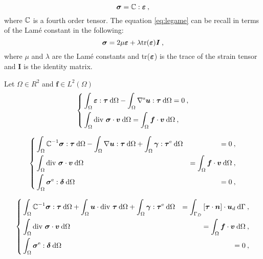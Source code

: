 \begin{equation}	\label{eq:legame}
\bm{\sigma} = \bm{\mathbb{C}} : \bm{\varepsilon}\:,
\end{equation}
where $\bm{\mathbb{C}}$ is a fourth order tensor. The equation \eqref{eq:legame} can be recall in terms of the Lamé constant in the following:
\begin{equation}
\bm{\sigma} = 2\mu\bm{\varepsilon} + \lambda \mbox{tr}(\bm{\varepsilon})\bm{I}\:,
\end{equation}
where $\mu$ and $\lambda$ are the Lamé constants and tr($\bm{\varepsilon}$) is the trace of the strain tensor and $\bm{I}$ is the identity matrix.

Let $\Omega \in R^{2}$ and $\bm{f}\in L^{2}(\Omega)$
\begin{equation} \label{eq:weak_form_0}
\left\lbrace
\begin{split}
&\int_{\Omega} \bm{\varepsilon} : \bm{\tau} \: \text{d}\Omega - \int_{\Omega} \nabla^\text{s}\bm{u} : \bm{\tau} \: \text{d}\Omega = 0\:,\\
&\int_{\Omega} \mbox{div }\bm{\sigma} \cdot \bm{v} \: \text{d}\Omega = \int_{\Omega} \bm{f}\cdot\bm{v}\: \text{d}\Omega\:,
\end{split}
\right.
\end{equation}

\begin{equation} \label{eq:weak_form_1}
\left\lbrace
\begin{split}
&\int_{\Omega} \bm{\mathbb{C}}^{-1}\bm{\sigma} : \bm{\tau} \: \text{d}\Omega - 
\int_{\Omega} \nabla\bm{u} : \bm{\tau} \: \text{d}\Omega + \int_{\Omega} \bm{\gamma} : \bm{\tau}^\text{e} \: \text{d}\Omega &= 0\:,\\
&\int_{\Omega} \mbox{div }\bm{\sigma} \cdot \bm{v} \: \text{d}\Omega &= \int_{\Omega} \bm{f}\cdot\bm{v}\: \text{d}\Omega\:,\\
&\int_{\Omega} \bm{\sigma}^\text{e} : \bm{\delta} \: \text{d}\Omega &= 0 \:,
\end{split}
\right.
\end{equation}


\begin{equation} \label{eq:weak_form_2}
\left\lbrace
\begin{split}
&\int_{\Omega} \bm{\mathbb{C}}^{-1}\bm{\sigma} : \bm{\tau} \: \text{d}\Omega + \int_{\Omega} \bm{u} \cdot \mbox{div }\bm{\tau} \: \text{d}\Omega + \int_{\Omega} \bm{\gamma} : \bm{\tau}^\text{e} \: \text{d}\Omega &= \int_{\Gamma_{D}} \left[\bm{\tau} \cdot \bm{n} \right] \cdot \bm{u}_{d} \: \text{d}\Gamma\:,\\
&\int_{\Omega} \mbox{div }\bm{\sigma} \cdot \bm{v} \: \text{d}\Omega &= \int_{\Omega} \bm{f}\cdot\bm{v}\: \text{d}\Omega\:,\\
&\int_{\Omega} \bm{\sigma}^\text{e} : \bm{\delta} \: \text{d}\Omega &= 0 \:,
\end{split}
\right.
\end{equation}